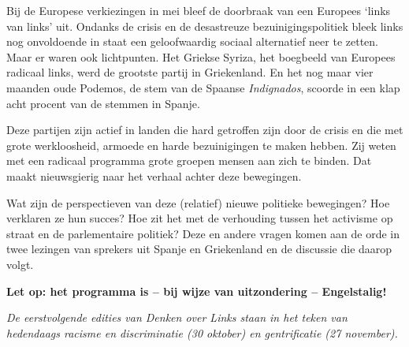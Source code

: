 \documentclass[12pt]{article}
\begin{document}
Bij de Europese verkiezingen in mei bleef de doorbraak van een Europees `links
van links' uit. Ondanks de crisis en de desastreuze bezuinigingspolitiek bleek
links nog onvoldoende in staat een geloofwaardig sociaal alternatief neer te
zetten. Maar er waren ook lichtpunten. Het Griekse Syriza, het
boegbeeld van Europees radicaal links, werd de grootste partij in Griekenland.
En het nog maar vier maanden oude Podemos, de stem van de Spaanse
\emph{Indignados}, scoorde in een klap acht procent van de stemmen in Spanje. 

Deze partijen zijn actief in landen die hard getroffen zijn door de crisis en die met grote 
werkloosheid, armoede en harde bezuinigingen te maken hebben. Zij weten met een 
radicaal programma grote groepen mensen aan zich te binden. Dat maakt nieuwsgierig 
naar het verhaal achter deze bewegingen.

Wat zijn de perspectieven van deze (relatief) nieuwe politieke bewegingen? Hoe verklaren 
ze hun succes? Hoe zit het met de verhouding tussen het activisme op straat en de 
parlementaire politiek? Deze en andere vragen komen aan de orde in twee lezingen van 
sprekers uit Spanje en Griekenland en de discussie die daarop volgt.

\vfill

\textbf{Let op: het programma is -- bij wijze van uitzondering -- Engelstalig!}

\emph{De eerstvolgende edities van Denken over Links staan in het teken van hedendaags 
racisme en discriminatie (30 oktober) en gentrificatie (27 november).}

\DolFooterLarge
\end{document}
